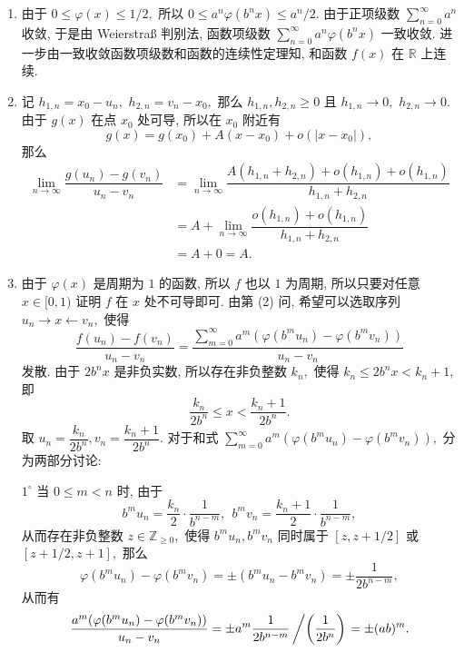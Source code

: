 \begin{solution}
\begin{enumerate}
\item 由于 $0 \leqslant \varphi(x) \leqslant 1/2,$
所以 $0 \leqslant a^n \varphi(b^n x) \leqslant a^n/2.$ 由于正项级数 $\displaystyle \sum_{n=0}^{\infty} a^n$ 收敛,
于是由 Weierstraß 判别法, 函数项级数 $\displaystyle \sum_{n=0}^{\infty} a^n \varphi(b^n x)$ 一致收敛.
进一步由一致收敛函数项级数和函数的连续性定理知, 和函数 $f(x)$ 在 $\mathbb{R}$ 上连续.
\item 记 $h_{1,n} = x_0 - u_n,$ $h_{2,n} = v_n - x_0,$ 那么 $h_{1,n}, h_{2,n} \geqslant 0$ 且 $h_{1,n} \to 0,$ $h_{2,n} \to 0.$ 由于 $g(x)$ 在点 $x_0$ 处可导, 所以在 $x_0$ 附近有
\begin{equation*}
g(x) = g(x_0) + A (x - x_0) + o(|x - x_0|),
\end{equation*}
那么
\begin{align*}
\lim_{n\to\infty} \dfrac{g(u_n) - g(v_n)}{u_n - v_n} & = \lim_{n\to\infty} \dfrac{A (h_{1,n} + h_{2,n}) + o(h_{1,n}) + o(h_{1,n})}{h_{1,n} + h_{2,n}} \\
& = A + \lim_{n\to\infty} \dfrac{o(h_{1,n}) + o(h_{1,n})}{h_{1,n} + h_{2,n}} \\
& = A + 0 = A.
\end{align*}
\item 由于 $\varphi(x)$ 是周期为 $1$ 的函数, 所以 $f$ 也以 $1$ 为周期, 所以只要对任意 $x \in [0, 1)$ 证明 $f$ 在 $x$ 处不可导即可. 由第 (2) 问, 希望可以选取序列 $u_n \rightarrow x \leftarrow v_n,$ 使得
\begin{equation*}
\dfrac{f(u_n) - f(v_n)}{u_n - v_n}
= \dfrac{\sum\limits_{m=0}^{\infty} a^m (\varphi(b^m u_n) - \varphi(b^m v_n))}{u_n - v_n}
\end{equation*}
发散. 由于 $2 b^n x$ 是非负实数, 所以存在非负整数 $k_n,$ 使得 $k_n \leqslant 2 b^n x < k_n + 1,$ 即
\begin{equation*}
\dfrac{k_n}{2 b^n} \leqslant x < \dfrac{k_n + 1}{2 b^n}.
\end{equation*}
取 $u_n = \dfrac{k_n}{2 b^n}, v_n = \dfrac{k_n + 1}{2 b^n}.$ 对于和式 $\displaystyle \sum\limits_{m=0}^{\infty} a^m (\varphi(b^m u_n) - \varphi(b^m v_n)),$ 分为两部分讨论:

$1^{\circ}$ 当 $0 \leqslant m < n$ 时, 由于
\begin{equation*}
b^m u_n = \dfrac{k_n}{2} \cdot \dfrac{1}{b^{n-m}}, ~~ b^m v_n = \dfrac{k_n + 1}{2} \cdot \dfrac{1}{b^{n-m}},
\end{equation*}
从而存在非负整数 $z \in \mathbb{Z}_{\geqslant 0},$ 使得 $b^m u_n, b^m v_n$ 同时属于 $[z, z+1/2]$ 或 $[z+1/2, z+1],$ 那么
\begin{equation*}
\varphi(b^m u_n) - \varphi(b^m v_n) = \pm (b^m u_n - b^m v_n) = \pm \dfrac{1}{2 b^{n-m}},
\end{equation*}
从而有
\begin{equation*}
\dfrac{a^m (\varphi(b^m u_n) - \varphi(b^m v_n))}{u_n - v_n}
= \pm a^m \dfrac{1}{2 b^{n-m}} \left/ \left( \dfrac{1}{2 b^n}\right) \right.
= \pm (ab)^m.
\end{equation*}


\end{enumerate}
\end{solution}
